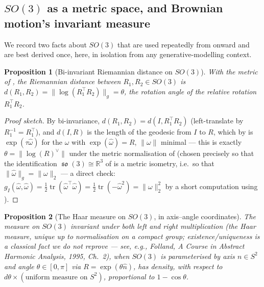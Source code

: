 \documentclass[11pt,a4paper]{report}
\newtheorem{proposition}[proposition]{Proposition}
\theoremstyle{definition}
\theoremstyle{remark}
\DeclareMathOperator{\so}{\mathfrak{so}}
\DeclareMathOperator{\tr}{tr}
\newcommand{\RR}{\mathbb R}
\begin{document}
\subsection{$SO(3)$ as a metric space, and Brownian motion's invariant measure}
\label{sec:so3-uniform}

We record two facts about $SO(3)$ that are used repeatedly from
 onward and are best derived once, here, in isolation
from any generative-modelling context.

\begin{proposition}[Bi-invariant Riemannian distance on $SO(3)$]
\label{prop:so3-distance}
With the metric of , the Riemannian distance
between $R_1,R_2\in SO(3)$ is $d(R_1,R_2) = \|\log(R_1^\top R_2)\|_g = \theta$,
the rotation angle of the relative rotation $R_1^\top R_2$.
\end{proposition}

\begin{proof}[Proof sketch]
By bi-invariance, $d(R_1,R_2)=d(I,R_1^\top R_2)$ (left-translate by
$R_1^{-1}=R_1^\top$), and $d(I,R)$ is the length of the geodesic from $I$ to
$R$, which by  is $\exp(\tau\widehat\omega)$
for the $\omega$ with $\exp(\widehat\omega)=R$, $\|\omega\|$ minimal --- this
is exactly $\theta=\|\log(R)^\vee\|$ under the metric normalisation of
 (chosen precisely so that the identification
$\so(3)\cong\RR^3$ of  is a metric isometry, i.e.\
so that $\|\widehat\omega\|_g=\|\omega\|_2$ --- a direct check:
$g_I(\widehat\omega,\widehat\omega)=\tfrac12\tr(\widehat\omega^\top\widehat\omega)=\tfrac12\tr(-\widehat\omega^2)=\|\omega\|_2^2$
by a short computation using \Cref{prop:hat-cross}).
\end{proof}

\begin{proposition}[The Haar measure on $SO(3)$, in axis--angle coordinates]
\label{prop:haar-so3}
The measure on $SO(3)$ invariant under both left and right multiplication
(the \emph{Haar measure}, unique up to normalisation on a compact group;
existence/uniqueness is a classical fact we do not reprove --- see, e.g.,
Folland, \emph{A Course in Abstract Harmonic Analysis}, 1995, Ch.~2), when
$SO(3)$ is parameterised by axis $n\in S^2$ and angle $\theta\in[0,\pi]$ via
$R=\exp(\theta\widehat n)$, has density, with respect to
$d\theta\times(\text{uniform measure on }S^2)$, proportional to
$1-\cos\theta$.
\end{proposition}
\end{document}

